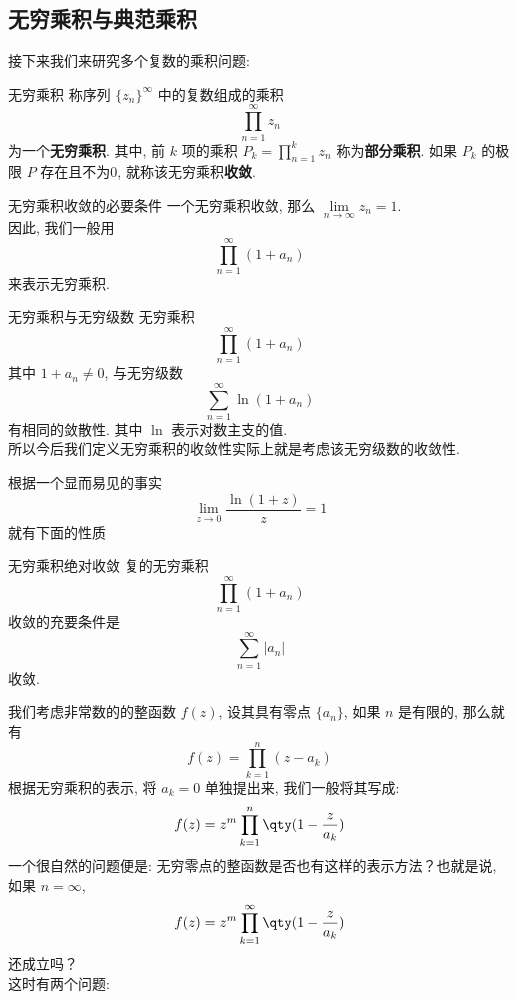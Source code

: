 \documentclass[UTF8]{ctexart}
\begin{document}
    \subsection{无穷乘积与典范乘积}

        接下来我们来研究多个复数的乘积问题: 

        \begin{dfn}
            {无穷乘积}
            称序列 \(\{z_n\}^\infty\) 中的复数组成的乘积
            \[\prod_{n=1}^{\infty}z_n\]
            为一个\textbf{无穷乘积}. 其中, 前 \(k\) 项的乘积 \(P_k=\prod\limits_{n=1}^{k}z_n\) 称为\textbf{部分乘积}. 如果 \(P_k\) 的极限 \(P\) 存在且不为0, 就称该无穷乘积\textbf{收敛}. 
        \end{dfn}

        \begin{ppt}
            {无穷乘积收敛的必要条件}
            一个无穷乘积收敛, 那么 \(\lim\limits_{n\to\infty}z_n=1\).\\
            因此, 我们一般用
            \[\prod_{n=1}^{\infty}(1+a_n)\]
            来表示无穷乘积. 
        \end{ppt}

        \begin{ppt}
            {无穷乘积与无穷级数}
            无穷乘积
            \[\prod_{n=1}^{\infty}(1+a_n)\]
            其中 \(1+a_n\neq 0\), 与无穷级数
            \[\sum_{n=1}^\infty\ln(1+a_n)\]
            有相同的敛散性. 其中 \(\ln\) 表示对数主支的值. \\
            所以今后我们定义无穷乘积的收敛性实际上就是考虑该无穷级数的收敛性. 
        \end{ppt}

        根据一个显而易见的事实
        \[\lim_{z\to 0}\frac{\ln(1+z)}{z}=1\]
        就有下面的性质

        \begin{ppt}
            {无穷乘积绝对收敛}
            复的无穷乘积
            \[\prod_{n=1}^{\infty}(1+a_n)\]
            收敛的充要条件是
            \[\sum_{n=1}^\infty|a_n|\]
            收敛. 
        \end{ppt}

        我们考虑非常数的的整函数 \(f(z)\), 设其具有零点 \(\{a_n\}\), 如果 \(n\) 是有限的, 那么就有
        \[f(z)=\prod_{k=1}^{n}(z-a_k)\]
        根据无穷乘积的表示, 将 \(a_k=0\) 单独提出来, 我们一般将其写成: 
        \[f(z)=z^m\prod_{k=1}^{n}\qty(1-\frac{z}{a_k})\]
        一个很自然的问题便是: 无穷零点的整函数是否也有这样的表示方法？也就是说, 如果 \(n=\infty\), 
        \[f(z)=z^m\prod_{k=1}^{\infty}\qty(1-\frac{z}{a_k})\]
        还成立吗？\\
        这时有两个问题: 
        
\end{document}
